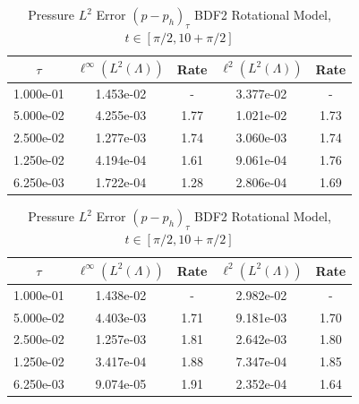 \documentclass[letterpaper]{erdc}
\begin{document}
\begin{table}[h!]
  \parbox{.45\linewidth}{
  \tiny
  \centering
    \caption{Density $L^2$ Error $(\rho - \rho_h)_{\tau}$ BDF2 Rotational Model, $t\in[\pi/2, 10+\pi/2]$}
    \begin{tabular}{c|c|c|c|c}
      $\tau$  & $\ell^{\infty}\left(L^2(\Lambda)\right)$ &  Rate  &  $\ell^2\left(L^2(\Lambda)\right)$  &  Rate\\
      \hline
      1.000e-01 & 1.453e-02 &  -   & 3.377e-02 &  -  \\
      5.000e-02 & 4.255e-03 & 1.77 & 1.021e-02 & 1.73\\
      2.500e-02 & 1.277e-03 & 1.74 & 3.060e-03 & 1.74\\
      1.250e-02 & 4.194e-04 & 1.61 & 9.061e-04 & 1.76\\
      6.250e-03 & 1.722e-04 & 1.28 & 2.806e-04 & 1.69
    \end{tabular}
    }
    \hfill
    \parbox{.45\linewidth}{
      \tiny
      \centering
        \caption{Pressure $L^2$ Error $(p - p_h)_{\tau}$ BDF2 Rotational Model, $t\in[\pi/2, 10+\pi/2]$}
        \begin{tabular}{c|c|c|c|c}
          $\tau$ &  $\ell^{\infty}\left(L^2(\Lambda)\right)$ &  Rate  &  $\ell^2\left(L^2(\Lambda)\right)$  &  Rate\\
          \hline
          1.000e-01 & 1.438e-02 &  -   & 2.982e-02 &  -  \\
          5.000e-02 & 4.403e-03 & 1.71 & 9.181e-03 & 1.70\\
          2.500e-02 & 1.257e-03 & 1.81 & 2.642e-03 & 1.80\\
          1.250e-02 & 3.417e-04 & 1.88 & 7.347e-04 & 1.85\\
          6.250e-03 & 9.074e-05 & 1.91 & 2.352e-04 & 1.64
        \end{tabular}
    }
\end{table}
\end{document}
